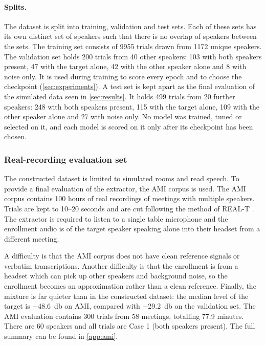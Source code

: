 \paragraph{Splits.} The dataset is split into training, validation and test sets. Each of these sets has its own distinct set of speakers such that there is no overlap of speakers between the sets. The training set consists of \num{9955} trials drawn from \num{1172} unique speakers. The validation set holds 200 trials from 40 other speakers: 103 with both speakers present, 47 with the target alone, 42 with the other speaker alone and 8 with noise only. It is used during training to score every epoch and to choose the checkpoint (\autoref{sec:experiments}). A test set is kept apart as the final evaluation of the simulated data seen in \autoref{sec:results}. It holds 499 trials from 20 further speakers: 248 with both speakers present, 115 with the target alone, 109 with the other speaker alone and 27 with noise only. No model was trained, tuned or selected on it, and each model is scored on it only after its checkpoint has been chosen.

\subsubsection{Real-recording evaluation set} 
The constructed dataset is limited to simulated rooms and read speech. To provide a final evaluation of the extractor, the AMI corpus \cite{carletta2005ami} is used. The AMI corpus contains 100 hours of real recordings of meetings with multiple speakers. Trials are kept to 10--20 seconds and are cut following the method of REAL-T \cite{li2025realt}. The extractor is required to listen to a single table microphone and the enrollment audio is of the target speaker speaking alone into their headset from a different meeting. 

A difficulty is that the AMI corpus does not have clean reference signals or verbatim transcriptions. Another difficulty is that the enrollment is from a headset which can pick up other speakers and background noise, so the enrollment becomes an approximation rather than a clean reference. Finally, the mixture is far quieter than in the constructed dataset: the median level of the target is \SI{-48.6}{\decibel} on AMI, compared with \SI{-29.2}{\decibel} on the validation set. The AMI evaluation contains 300 trials from 58 meetings, totalling 77.9 minutes. There are 60 speakers and all trials are Case 1 (both speakers present). The full summary can be found in \autoref{app:ami}.